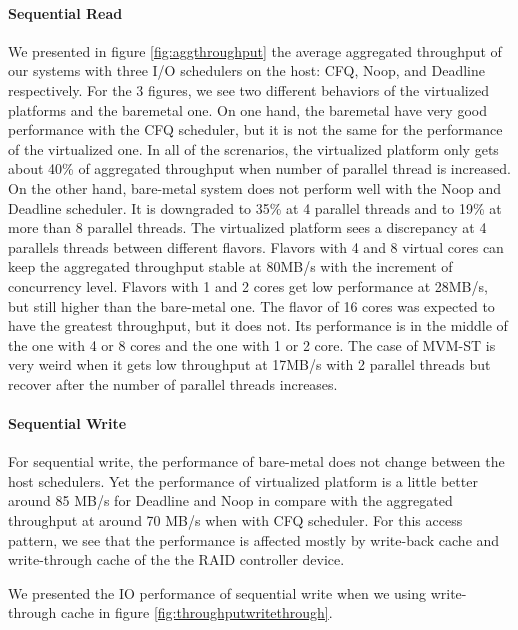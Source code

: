 \documentclass{acmsig}
\begin{document}
\paragraph{Sequential Read}
We presented in figure \ref{fig:aggthroughput} the average aggregated throughput of our systems with three I/O schedulers on the host: CFQ, Noop, and Deadline respectively. For the 3 figures, we see two different behaviors of the virtualized platforms and the baremetal one. On one hand, the baremetal have very good performance with the CFQ scheduler, but it is not the same for the performance of the virtualized one. In all of the screnarios, the virtualized platform only gets about 40\% of aggregated throughput when number of parallel thread is increased. On the other hand, bare-metal system does not perform well with the Noop and Deadline scheduler. It is downgraded to 35\% at 4 parallel threads and to 19\% at more than 8 parallel threads. The virtualized platform sees a discrepancy at 4 parallels threads between different flavors. Flavors with 4 and 8 virtual cores can keep the aggregated throughput stable at 80MB/s with the increment of concurrency level. Flavors with 1 and 2 cores get low performance at 28MB/s, but still higher than the bare-metal one. The flavor of 16 cores was expected to have the greatest throughput, but it does not. Its performance is in the middle of the one with 4 or 8 cores and the one with 1 or 2 core. The case of MVM-ST is very weird when it gets low throughput at 17MB/s with 2 parallel threads but recover after the number of parallel threads increases.

\paragraph{Sequential Write}
For sequential write, the performance of bare-metal does not change between the host schedulers. Yet the performance of virtualized platform is a little better around 85 MB/s for Deadline and Noop in compare with the aggregated throughput at around 70 MB/s when with CFQ scheduler.
For this access pattern, we see that the performance is affected mostly by write-back cache and write-through cache of the the RAID controller device.

We presented the IO performance of sequential write when we using write-through cache in figure \ref{fig:throughputwritethrough}.
\end{document}
